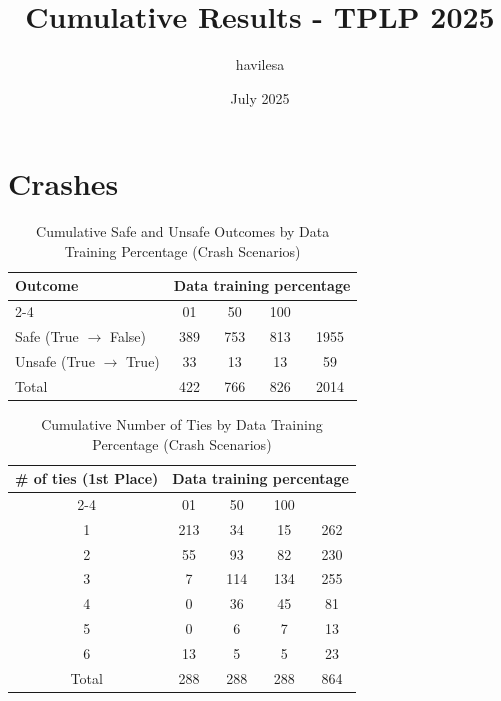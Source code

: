 \documentclass{article}
\title{Cumulative Results - TPLP 2025}
\author{havilesa}
\date{July 2025}
\begin{document}
\maketitle

\section{Crashes}
\begin{table}[h]
\centering
\caption{Cumulative Safe and Unsafe Outcomes by Data Training Percentage (Crash Scenarios)}
\begin{tabular}{l|ccc|c}
\toprule
\multirow{2}{*}{Outcome} & \multicolumn{5}{c|}{Data training percentage} & \multirow{2}{*}{Total} \\
\cmidrule{2-4}
 & 01 & 50 & 100 & \\
\midrule
Safe (True $\rightarrow$ False) & 389 & 753 & 813 & 1955 \\ 
Unsafe (True $\rightarrow$ True) & 33 & 13 & 13 & 59 \\ 
\midrule
Total & 422 & 766 & 826 & 2014 \\ 
\bottomrule
\end{tabular}
\end{table}

\begin{table}[h]
\centering
\caption{Cumulative Number of Ties by Data Training Percentage (Crash Scenarios)}
\begin{tabular}{c|ccc|c}
\toprule
\multirow{2}{*}{\# of ties (1st Place)} & \multicolumn{5}{c|}{Data training percentage} & \multirow{2}{*}{Total} \\
\cmidrule{2-4}
 & 01 & 50  & 100 & \\
\midrule
1 & 213 & 34 & 15 & 262 \\ 
2 & 55 & 93 & 82 & 230 \\ 
3 & 7 & 114 & 134 & 255 \\ 
4 & 0 & 36 & 45 & 81 \\ 
5 & 0 & 6 & 7 & 13 \\ 
6 & 13 & 5 & 5 & 23 \\ 
\midrule
Total & 288 & 288 & 288 & 864 \\ 
\bottomrule
\end{tabular}
\end{table}
\end{document}
